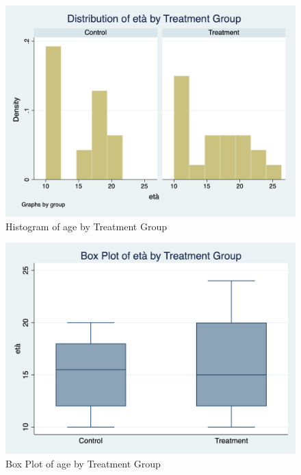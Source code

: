 \documentclass{article}
\begin{document}
\begin{figure}[h]
\centering
\includegraphics[scale=0.39]{histogram_eta_ntrad.png}
\caption{Histogram of age by Treatment Group}
\end{figure}

\begin{figure}[h]
\centering
\includegraphics[scale=0.30]{box_plot_eta_ntrad.png}
\caption{Box Plot of age by Treatment Group}
\end{figure}
\end{document}

